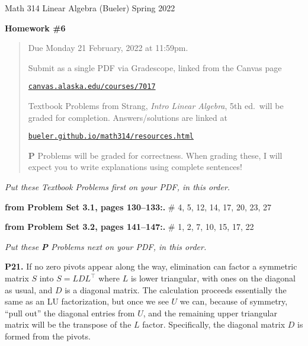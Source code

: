\documentclass[12pt]{amsart}
\newcommand{\prob}[1]{\bigskip\noindent\textbf{#1.}\quad }
\newcommand{\probset}[2]{\prob{from Problem Set #1, pages #2:}}
\begin{document}
\scriptsize \noindent Math 314 Linear Algebra (Bueler) \hfill Spring 2022
\normalsize\medskip

\Large
\centerline{\textbf{Homework \#6}}

\normalsize
\bigskip
\begin{quote}
Due Monday 21 February, 2022 at 11:59pm.

\medskip
\noindent Submit as a single PDF via Gradescope, linked from the Canvas page

\href{https://canvas.alaska.edu/courses/7017}{\texttt{canvas.alaska.edu/courses/7017}}

\noindent Textbook Problems from Strang, \emph{Intro Linear Algebra}, 5th ed.~will be graded for completion.  Answers/solutions are linked at

\href{https://bueler.github.io/math314/resources.html}{\texttt{bueler.github.io/math314/resources.html}}

\noindent \textbf{P} Problems will be graded for correctness.  When grading these, I will expect you to write explanations using complete sentences!
\end{quote}
\medskip

\thispagestyle{empty}

\noindent \hrulefill

\noindent \emph{Put these Textbook Problems first on your PDF, in this order.}

\probset{3.1}{130--133} \# 4, 5, 12, 14, 17, 20, 23, 27

\probset{3.2}{141--147} \# 1, 2, 7, 10, 15, 17, 22


\bigskip
\noindent \hrulefill

\noindent \emph{Put these \textbf{P} Problems next on your PDF, in this order.}

\prob{P21}  If no zero pivots appear along the way, elimination can factor a symmetric matrix $S$ into $S=L D L^\top$ where $L$ is lower triangular, with ones on the diagonal as usual, and $D$ is a diagonal matrix.  The calculation proceeds essentially the same as an LU factorization, but once we see $U$ we can, because of symmetry, ``pull out'' the diagonal entries from $U$, and the remaining upper triangular matrix will be the transpose of the $L$ factor.  Specifically, the diagonal matrix $D$ is formed from the pivots.
\end{document}
